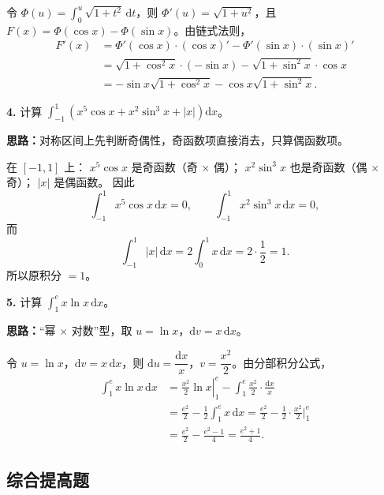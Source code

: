 令 $\Phi(u)=\int_0^u\sqrt{1+t^2}\,\mathrm dt$，则 $\Phi'(u)=\sqrt{1+u^2}$，且 $F(x)=\Phi(\cos x)-\Phi(\sin x)$。由链式法则，
\[
\begin{aligned}
  F'(x)&=\Phi'(\cos x)\cdot(\cos x)'-\Phi'(\sin x)\cdot(\sin x)'\\
  &=\sqrt{1+\cos^2x}\cdot(-\sin x)-\sqrt{1+\sin^2x}\cdot\cos x\\
  &=-\sin x\sqrt{1+\cos^2x}-\cos x\sqrt{1+\sin^2x}.
\end{aligned}
\]

\else \answerarea[8] \fi%

\textbf{4.} 计算 $\displaystyle\int_{-1}^{1}\left(x^5\cos x+x^2\sin^3x+|x|\right)\mathrm dx$。

\ifshowsolutions%
\textbf{思路：}对称区间上先判断奇偶性，奇函数项直接消去，只算偶函数项。

在 $[-1,1]$ 上：
$x^5\cos x$ 是奇函数（奇 $\times$ 偶）；
$x^2\sin^3x$ 也是奇函数（偶 $\times$ 奇）；
$|x|$ 是偶函数。
因此
\[
  \int_{-1}^{1}x^5\cos x\,\mathrm dx=0,\qquad
  \int_{-1}^{1}x^2\sin^3x\,\mathrm dx=0,
\]
而
\[
  \int_{-1}^{1}|x|\,\mathrm dx=2\int_0^1 x\,\mathrm dx=2\cdot\frac12=1.
\]
所以原积分 $=1$。

\else \answerarea[8] \fi%

\textbf{5.} 计算 $\displaystyle\int_{1}^{e}x\ln x\,\mathrm dx$。

\ifshowsolutions%
\textbf{思路：}“幂 $\times$ 对数”型，取 $u=\ln x$，$\mathrm dv=x\,\mathrm dx$。

令 $u=\ln x$，$\mathrm dv=x\,\mathrm dx$，则 $\mathrm du=\dfrac{\mathrm dx}{x}$，$v=\dfrac{x^2}{2}$。由分部积分公式，
\[
\begin{aligned}
  \int_1^e x\ln x\,\mathrm dx
  &=\left.\frac{x^2}{2}\ln x\right|_1^e-\int_1^e\frac{x^2}{2}\cdot\frac{\mathrm dx}{x}\\
  &=\frac{e^2}{2}-\frac12\int_1^e x\,\mathrm dx
   =\frac{e^2}{2}-\frac12\cdot\frac{x^2}{2}\Big|_1^e\\
  &=\frac{e^2}{2}-\frac{e^2-1}{4}
   =\frac{e^2+1}{4}.
\end{aligned}
\]

\else \answerarea[8] \fi%

\subsection{综合提高题}

